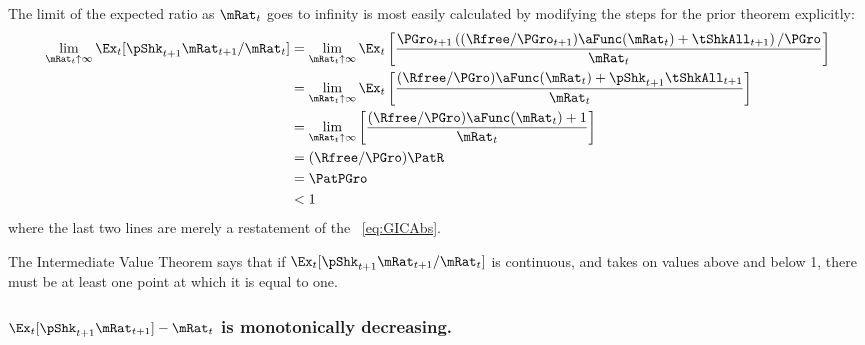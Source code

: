 \documentclass[\econtexRoot/BufferStockTheory]{subfiles}
\begin{document}
The limit of the expected ratio as $\mRat_{t}$ goes to infinity is most easily calculated by modifying the steps for the prior theorem explicitly:
\begin{equation}\begin{gathered}\begin{aligned}
  \lim_{\mRat_{t} \uparrow \infty} \Ex_{t}[\pShk_{t+1}\mRat_{t+1}/\mRat_{t}]  & =   
                                                                  \lim_{\mRat_{t} \uparrow \infty} 
                                                                  \Ex_{t}\left[\frac{\PGro_{t+1}\left((\Rfree/\PGro_{t+1})\aFunc(\mRat_{t})+{\tShkAll}_{t+1}\right)/\PGro}{\mRat_{t}}\right] \notag 
  \\   & =   \lim_{\mRat_{t} \uparrow \infty} \Ex_{t}\left[
         \frac{(\Rfree/\PGro)\aFunc(\mRat_{t})+\pShk_{t+1}{\tShkAll}_{t+1}}{\mRat_{t}}
         \right] \notag 
  \\   & =   \lim_{\mRat_{t} \uparrow \infty} \left[
         \frac{(\Rfree/\PGro)\aFunc(\mRat_{t})+1}{\mRat_{t}}
         \right] \notag 
  \\  & = (\Rfree/\PGro)\PatR \label{eq:emgro2}
  \\  & = \PatPGro \notag
  \\  & < 1 \notag
\end{aligned}\end{gathered}\end{equation}
where the last two lines are merely a restatement of the \GICAbs~\eqref{eq:GICAbs}.

The Intermediate Value Theorem says that if $\Ex_{t}[\pShk_{t+1}\mRat_{t+1}/\mRat_t]$ is continuous, and takes on values above and below 1, there must be at least one point at which it is equal to one.

\subsubsection{$\Ex_{t}[\pShk_{t+1}\mRat_{t+1}] -\mRat_t$ is monotonically decreasing.}
\end{document}
